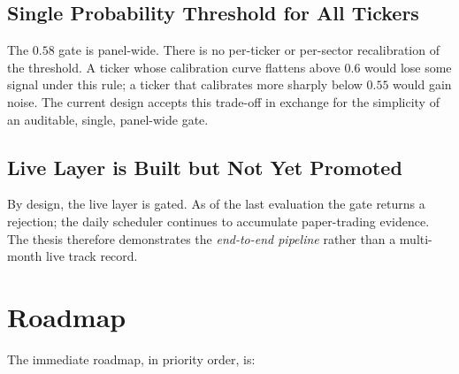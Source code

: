\subsection{Single Probability Threshold for All Tickers}

The $0.58$ gate is panel-wide. There is no per-ticker or per-sector recalibration of the threshold. A ticker whose calibration curve flattens above $0.6$ would lose some signal under this rule; a ticker that calibrates more sharply below $0.55$ would gain noise. The current design accepts this trade-off in exchange for the simplicity of an auditable, single, panel-wide gate.

\subsection{Live Layer is Built but Not Yet Promoted}

By design, the live layer is gated. As of the last evaluation the gate returns a rejection; the daily scheduler continues to accumulate paper-trading evidence. The thesis therefore demonstrates the \emph{end-to-end pipeline} rather than a multi-month live track record.

\section{Roadmap}

The immediate roadmap, in priority order, is:

